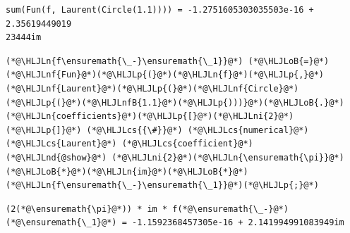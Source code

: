 \documentclass[12pt,a4paper]{article}
\newcommand{\HLJLn}[1]{#1}
\newcommand{\HLJLnd}[1]{\textcolor[RGB]{214,102,97}{#1}}
\newcommand{\HLJLnf}[1]{\textcolor[RGB]{66,102,213}{#1}}
\newcommand{\HLJLnfB}[1]{\textcolor[RGB]{59,151,46}{#1}}
\newcommand{\HLJLni}[1]{\textcolor[RGB]{59,151,46}{#1}}
\newcommand{\HLJLoB}[1]{\textcolor[RGB]{102,102,102}{\textbf{#1}}}
\newcommand{\HLJLp}[1]{#1}
\newcommand{\HLJLcs}[1]{\textcolor[RGB]{153,153,119}{\textit{#1}}}
\begin{document}
\begin{lstlisting}
sum(Fun(f, Laurent(Circle(1.1)))) = -1.2751605303035503e-16 + 2.35619449019
23444im
\end{lstlisting}


\begin{lstlisting}
(*@\HLJLn{f\ensuremath{\_-}\ensuremath{\_1}}@*) (*@\HLJLoB{=}@*) (*@\HLJLnf{Fun}@*)(*@\HLJLp{(}@*)(*@\HLJLn{f}@*)(*@\HLJLp{,}@*) (*@\HLJLnf{Laurent}@*)(*@\HLJLp{(}@*)(*@\HLJLnf{Circle}@*)(*@\HLJLp{(}@*)(*@\HLJLnfB{1.1}@*)(*@\HLJLp{)))}@*)(*@\HLJLoB{.}@*)(*@\HLJLn{coefficients}@*)(*@\HLJLp{[}@*)(*@\HLJLni{2}@*)(*@\HLJLp{]}@*) (*@\HLJLcs{{\#}}@*) (*@\HLJLcs{numerical}@*) (*@\HLJLcs{Laurent}@*) (*@\HLJLcs{coefficient}@*)
(*@\HLJLnd{@show}@*) (*@\HLJLni{2}@*)(*@\HLJLn{\ensuremath{\pi}}@*)(*@\HLJLoB{*}@*)(*@\HLJLn{im}@*)(*@\HLJLoB{*}@*)(*@\HLJLn{f\ensuremath{\_-}\ensuremath{\_1}}@*)(*@\HLJLp{;}@*)
\end{lstlisting}

\begin{lstlisting}
(2(*@\ensuremath{\pi}@*)) * im * f(*@\ensuremath{\_-}@*)(*@\ensuremath{\_1}@*) = -1.1592368457305e-16 + 2.141994991083949im
\end{lstlisting}
\end{document}
